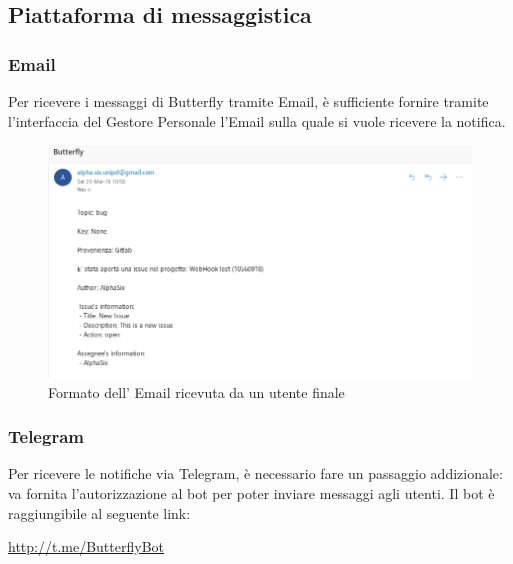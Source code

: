 \newpage

\subsection{Piattaforma di messaggistica}

\subsubsection{Email}

Per ricevere i messaggi di Butterfly tramite Email, è sufficiente fornire tramite l'interfaccia del Gestore Personale l'Email sulla quale si vuole ricevere la notifica.

\begin{figure}[H]
	\centering
	\includegraphics[width=\textwidth]{img/notifica_email_1.png}
	\caption{Formato dell' Email ricevuta da un utente finale}
\end{figure}

\subsubsection{Telegram}

Per ricevere le notifiche via Telegram, è necessario fare un passaggio addizionale: va fornita l'autorizzazione al bot per poter inviare messaggi agli utenti.
Il bot è raggiungibile al seguente link:
\begin{center}
    \url{http://t.me/ButterflyBot}
\end{center}

